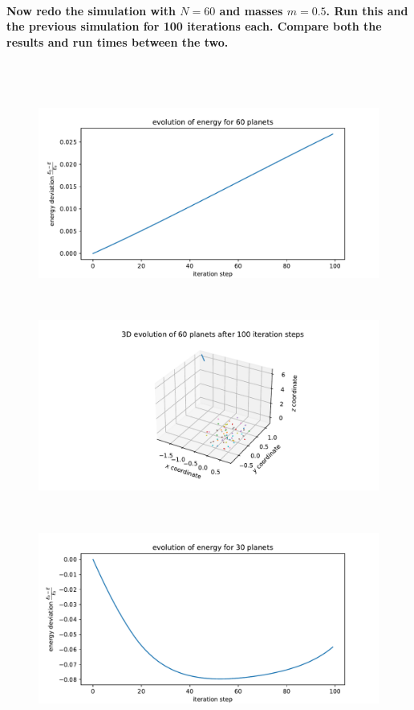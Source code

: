     \paragraph{Now redo the simulation with $N=60$ and masses $m=0.5$. Run this and 
        the previous simulation for 100 iterations each. Compare both the 
        results and run times between the two.
        } \ \\
        \\
        \begin{figure}[h!]
            \centering
            \includegraphics[width=\textwidth]{./figures/task2_60body_energy_new_c.pdf}
        \end{figure} \ \\ 
        \begin{figure}[h!]
            \centering
            \includegraphics[width=\textwidth]{./figures/task2_60body_3D_new.pdf}
        \end{figure} \ \\ 
        \begin{figure}[h!]
            \centering
            \includegraphics[width=\textwidth]{./figures/task2_30body_energy_new_d.pdf}
        \end{figure} \ \\ 
